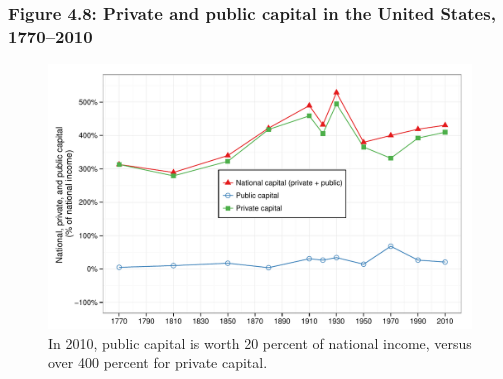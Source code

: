 \documentclass[t]{beamer}\usepackage[]{graphicx}\usepackage[]{color}
\newenvironment{knitrout}{}{} %
\begin{document}
\begin{frame}[label=Figure_4_8]
\frametitle{Figure 4.8: Private and public capital in the United States, 1770--2010}
\begin{figure}[t]
\begin{minipage}[b]{\textwidth}
\centering
\begin{knitrout}\footnotesize
{}\color{fgcolor}

{\centering \includegraphics[width=1\linewidth]{figures/color/Figure_4_8} 

}



\end{knitrout}
\caption{In 2010, public capital is worth 20 percent of national income, versus over 400 percent for private capital.}
\end{minipage}
\end{figure}
\end{frame}
\end{document}
